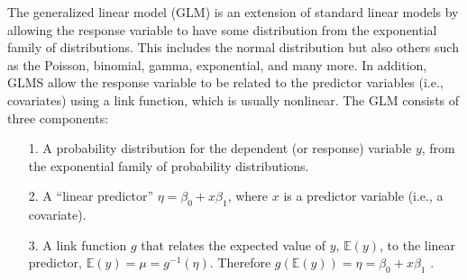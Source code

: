 The generalized linear model (GLM) is an extension of standard linear
models by allowing the response
variable to have some distribution from the exponential family of
distributions. This includes the normal
distribution but also others such as the Poisson, binomial,
gamma, exponential, and many more. In addition, GLMS allow the
response variable to be related to the predictor variables (i.e.,
covariates) using a link function, which is usually nonlinear.  
The GLM consists of three components:
\begin{itemize}
\item[1.] A probability distribution for the dependent (or response) variable $y$,
from the exponential family of probability distributions.
\item[2.] A ``linear predictor'' $\eta = \beta_0 + x \beta_1$, where
  $x$ is a predictor variable (i.e., a covariate).
\item[3.] A link function $g$ that relates the expected value of $y$, $\mathbb{E}(y)$, to the linear predictor, $\mathbb{E}(y) = \mu = g^{-1}(\eta)$. Therefore $g(\mathbb{E}(y)) = \eta = \beta_0 + x \beta_1$ .
\end{itemize}
